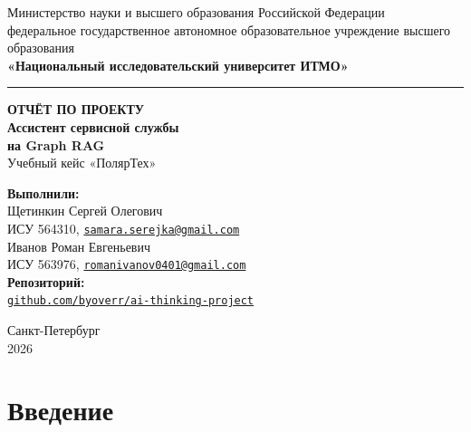 \documentclass[a4paper,12pt]{article}
\newcommand{\code}[1]{\texttt{#1}}
\begin{document}
\begin{titlepage}
\begin{center}
\singlespacing
{\large Министерство науки и высшего образования Российской Федерации}\\[2mm]
{\large федеральное государственное автономное образовательное учреждение высшего образования}\\[2mm]
{\large\bfseries «Национальный исследовательский университет ИТМО»}\\[2mm]
{\color{itmoblue}\rule{\linewidth}{1pt}}

\vfill

{\Large\bfseries ОТЧЁТ ПО ПРОЕКТУ}\\[6mm]
{\LARGE\bfseries Ассистент сервисной службы\\[2mm] на Graph RAG}\\[6mm]
{\large Учебный кейс «ПолярТех»}

\vfill

\begin{flushright}
\begin{minipage}{0.6\linewidth}
\raggedright
\textbf{Выполнили:}\\[1mm]
Щетинкин Сергей Олегович\\
ИСУ 564310, \href{mailto:samara.serejka@gmail.com}{\code{samara.serejka@gmail.com}}\\[3mm]
Иванов Роман Евгеньевич\\
ИСУ 563976, \href{mailto:romanivanov0401@gmail.com}{\code{romanivanov0401@gmail.com}}\\[5mm]
\textbf{Репозиторий:}\\
{\small\href{https://github.com/byoverr/ai-thinking-project}{\code{github.com/byoverr/ai-thinking-project}}}
\end{minipage}
\end{flushright}

\vfill

Санкт-Петербург\\
2026
\end{center}
\end{titlepage}

\setcounter{page}{2}
\tableofcontents
\newpage

\section*{Введение}
\end{document}
